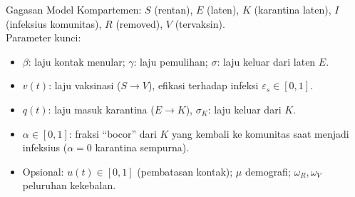 \documentclass[aspectratio=32]{beamer}
\begin{document}
\begin{frame}{Gagasan Model}
\small
Kompartemen: $S$ (rentan), $E$ (laten), $K$ (karantina laten), $I$ (infeksius komunitas), $R$ (removed), $V$ (tervaksin). \\
Parameter kunci:
\begin{itemize}
  \item $\beta$: laju kontak menular; $\gamma$: laju pemulihan; $\sigma$: laju keluar dari laten $E$.
  \item $v(t)$: laju vaksinasi ($S\!\to\!V$), efikasi terhadap infeksi $\varepsilon_s\in[0,1]$.
  \item $q(t)$: laju masuk karantina ($E\!\to\!K$), $\sigma_K$: laju keluar dari $K$.
  \item $\alpha\in[0,1]$: fraksi “bocor” dari $K$ yang kembali ke komunitas saat menjadi infeksius ($\alpha\!=\!0$ karantina sempurna).
  \item Opsional: $u(t)\in[0,1]$ (pembatasan kontak); $\mu$ demografi; $\omega_R,\omega_V$ peluruhan kekebalan.
\end{itemize}
\end{frame}

\end{document}
